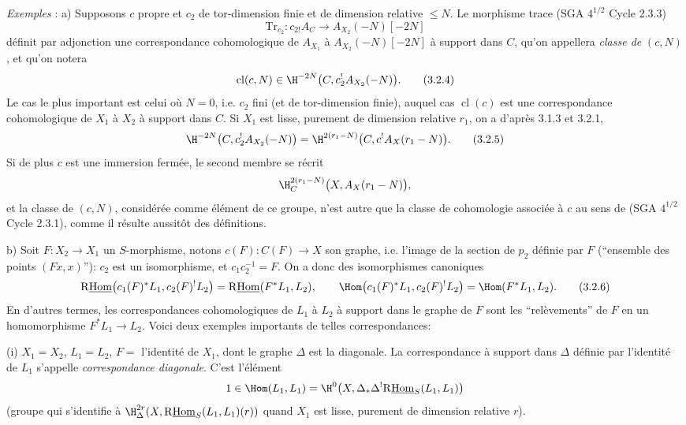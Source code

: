 \emph{Exemples} : a) Supposons $c$ propre et $c_2$ de tor-dimension finie et de dimension relative $\leq N$. Le morphisme trace (SGA $4^{1/2}$ Cycle 2.3.3)
\[
\mathrm{Tr}_{c_2}:c_{2!}A_C\longrightarrow A_{X_2}(-N)[-2N]
\]
définit par adjonction une correspondance cohomologique de $A_{X_1}$ à $A_{X_2}(-N)[-2N]$ 
à
support dans $C$, qu'on appellera \emph{classe de} $(c,N)$, et qu'on notera
\begin{equation}
\operatorname{cl}(c,N)\in \H^{-2N}\bigl(C,c_2^!A_{X_2}(-N)\bigr).
\tag{3.2.4}
\end{equation}
Le cas le plus important est celui où $N=0$, i.e. $c_2$ fini (et de tor-dimension finie), auquel cas $\operatorname{cl}(c)$ est une correspondance cohomologique de $X_1$ à $X_2$ à support dans $C$. Si $X_1$ est lisse, purement de dimension relative $r_1$, on a d'après 3.1.3 et 3.2.1,
\begin{equation}
\H^{-2N}\bigl(C,c_2^!A_{X_2}(-N)\bigr)
=
\H^{2(r_1-N)}\bigl(C,c^!A_X(r_1-N)\bigr).
\tag{3.2.5}
\end{equation}
Si de plus $c$ est une immersion fermée, le second membre se récrit
\[
\H^{2(r_1-N)}_C\bigl(X,A_X(r_1-N)\bigr),
\]
et la classe de $(c,N)$, considérée comme élément de ce groupe, n'est autre que la classe de cohomologie associée à $c$ au sens de (SGA $4^{1/2}$ Cycle 2.3.1), comme il résulte aussitôt des définitions.

b) Soit $F:X_2\to X_1$ un $S$-morphisme, notons $c(F):C(F)\to X$ son graphe, i.e. l'image de la section de $p_2$ définie par $F$ (``ensemble des points $(Fx,x)$''): $c_2$ est un isomorphisme, et $c_1c_2^{-1}=F$. On a donc des isomorphismes canoniques
\begin{equation}
\mathrm{R}\underline{\mathrm{Hom}}\bigl(c_1(F)^*L_1,c_2(F)^!L_2\bigr)=\mathrm{R}\underline{\mathrm{Hom}}(F^*L_1,L_2),
\qquad
\Hom\bigl(c_1(F)^*L_1,c_2(F)^!L_2\bigr)=\Hom(F^*L_1,L_2).
\tag{3.2.6}
\end{equation}
En d'autres termes, les correspondances cohomologiques de $L_1$ à $L_2$ à support dans le graphe de $F$ sont les ``relèvements'' de $F$ en un homomorphisme $F^*L_1\to L_2$. Voici deux exemples importants de telles correspondances:

(i) $X_1=X_2$, $L_1=L_2$, $F=$ l'identité de $X_1$, dont le graphe $\Delta$ est la diagonale. La correspondance à support dans $\Delta$ définie par l'identité de $L_1$ s'appelle \emph{correspondance diagonale}. C'est l'élément
\[
1\in \Hom(L_1,L_1)=\H^0\bigl(X,\Delta_*\Delta^!\mathrm{R}\underline{\mathrm{Hom}}_S(L_1,L_1)\bigr)
\]
(groupe qui s'identifie à 
$\H^{2r}_\Delta(X,\mathrm{R}\underline{\mathrm{Hom}}_S(L_1,L_1)(r))$ quand $X_1$ est lisse, purement de dimension relative $r$).

